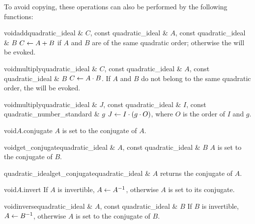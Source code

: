 To avoid copying, these operations can also be performed by the following functions:

\begin{fcode}{void}{add}{quadratic_ideal & $C$, const quadratic_ideal & $A$,
    const quadratic_ideal & $B$}%
  $C \leftarrow A + B$ if $A$ and $B$ are of the same quadratic order; otherwise the \LEH will be evoked.
\end{fcode}


\begin{fcode}{void}{multiply}{quadratic_ideal & $C$, const quadratic_ideal & $A$,
    const quadratic_ideal & $B$}%
  $C \leftarrow A \cdot B$.  If $A$ and $B$ do not belong to the same quadratic order, the \LEH will be
  evoked.
\end{fcode}

\begin{fcode}{void}{multiply}{quadratic_ideal & $J$, const quadratic_ideal & $I$,
    const quadratic_number_standard & $g$}%
  $J \leftarrow I \cdot (g \cdot O)$, where $O$ is the order of $I$ and $g$.
\end{fcode}

\begin{fcode}{void}{$A$.conjugate}{}
  $A$ is set to the conjugate of $A$.
\end{fcode}

\begin{fcode}{void}{get_conjugate}{quadratic_ideal & $A$, const quadratic_ideal & $B$}
  $A$ is set to the conjugate of $B$.
\end{fcode}

\begin{fcode}{quadratic_ideal}{get_conjugate}{quadratic_ideal & $A$}
  returns the conjugate of $A$.
\end{fcode}

\begin{fcode}{void}{$A$.invert}{}
  If $A$ is invertible, $A \leftarrow A^{-1}$, otherwise $A$ is set to its conjugate.
\end{fcode}

\begin{fcode}{void}{inverse}{quadratic_ideal & $A$, const quadratic_ideal & $B$}
  If $B$ is invertible, $A \leftarrow B^{-1}$, otherwise $A$ is set to the conjugate of $B$.
\end{fcode}

